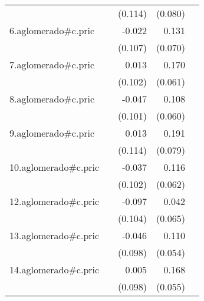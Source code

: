{\begin{longtable}{l*{4}{D{.}{.}{-1}}}
            &                     &     (0.114)         &     (0.080)         &                     \\
\addlinespace
6.aglomerado#c.pric&                     &      -0.022         &       0.131         &                     \\
            &                     &     (0.107)         &     (0.070)         &                     \\
\addlinespace
7.aglomerado#c.pric&                     &       0.013         &       0.170\sym{**} &                     \\
            &                     &     (0.102)         &     (0.061)         &                     \\
\addlinespace
8.aglomerado#c.pric&                     &      -0.047         &       0.108         &                     \\
            &                     &     (0.101)         &     (0.060)         &                     \\
\addlinespace
9.aglomerado#c.pric&                     &       0.013         &       0.191\sym{*}  &                     \\
            &                     &     (0.114)         &     (0.079)         &                     \\
\addlinespace
10.aglomerado#c.pric&                     &      -0.037         &       0.116         &                     \\
            &                     &     (0.102)         &     (0.062)         &                     \\
\addlinespace
12.aglomerado#c.pric&                     &      -0.097         &       0.042         &                     \\
            &                     &     (0.104)         &     (0.065)         &                     \\
\addlinespace
13.aglomerado#c.pric&                     &      -0.046         &       0.110\sym{*}  &                     \\
            &                     &     (0.098)         &     (0.054)         &                     \\
\addlinespace
14.aglomerado#c.pric&                     &       0.005         &       0.168\sym{**} &                     \\
            &                     &     (0.098)         &     (0.055)         &                     \\

\end{longtable}}
